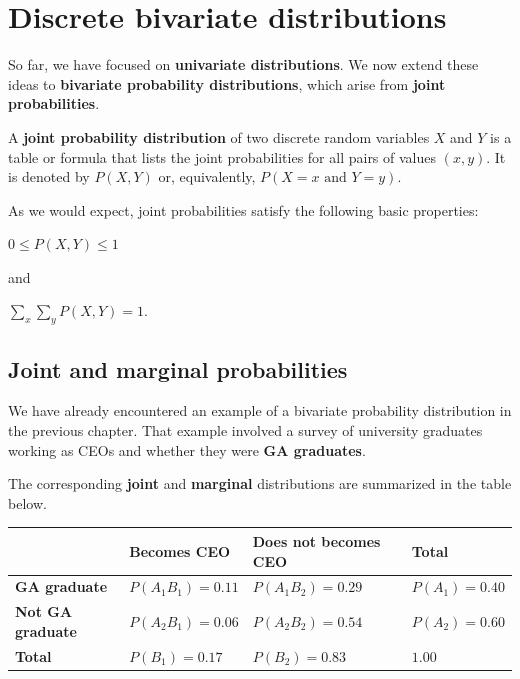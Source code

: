 \documentclass[
  letterpaper,
  DIV=11,
  numbers=noendperiod]{scrreprt}
\begin{document}
\section{Discrete bivariate
distributions}\label{discrete-bivariate-distributions}

So far, we have focused on \textbf{univariate distributions}. We now
extend these ideas to \textbf{bivariate probability distributions},
which arise from \textbf{joint probabilities}.

A \textbf{joint probability distribution} of two discrete random
variables \(X\) and \(Y\) is a table or formula that lists the joint
probabilities for all pairs of values \((x, y)\). It is denoted by
\(P(X,Y)\) or, equivalently, \(P(X = x \text{ and } Y = y)\).

As we would expect, joint probabilities satisfy the following basic
properties:

\(0 \le P(X,Y) \le 1\)

and

\(\sum_x \sum_y P(X,Y) = 1\).

\subsection{Joint and marginal
probabilities}\label{joint-and-marginal-probabilities}

We have already encountered an example of a bivariate probability
distribution in the previous chapter. That example involved a survey of
university graduates working as CEOs and whether they were \textbf{GA
graduates}.

The corresponding \textbf{joint} and \textbf{marginal} distributions are
summarized in the table below.

\begin{longtable}[]{@{}
  >{\raggedright\arraybackslash}p{}
  >{\raggedright\arraybackslash}p{}
  >{\raggedright\arraybackslash}p{}
  >{\raggedright\arraybackslash}p{}@{}}
\toprule\noalign{}
\begin{minipage}[b]{\linewidth}\raggedright
\end{minipage} & \begin{minipage}[b]{\linewidth}\raggedright
Becomes CEO
\end{minipage} & \begin{minipage}[b]{\linewidth}\raggedright
Does not becomes CEO
\end{minipage} & \begin{minipage}[b]{\linewidth}\raggedright
\textbf{Total}
\end{minipage} \\
\midrule\noalign{}
\endhead
\bottomrule\noalign{}
\endlastfoot
\textbf{GA graduate} & \(P(A_1 B_1)=0.11\) & \(P(A_1 B_2)=0.29\) &
\(P(A_1)=0.40\) \\
\textbf{Not GA graduate} & \(P(A_2 B_1)=0.06\) & \(P(A_2 B_2)=0.54\) &
\(P(A_2)=0.60\) \\
\textbf{Total} & \(P(B_1)=0.17\) & \(P(B_2)=0.83\) & \(1.00\) \\
\end{longtable}
\end{document}
